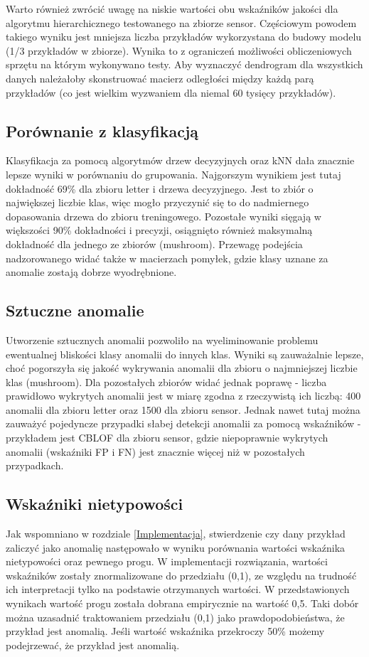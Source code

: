\documentclass[11pt,a4paper,twoside]{article}
\begin{document}
Warto również zwrócić uwagę na niskie wartości obu wskaźników jakości dla algorytmu hierarchicznego testowanego na zbiorze sensor. Częściowym powodem takiego wyniku jest mniejsza liczba przykładów wykorzystana do budowy modelu (1/3 przykładów w zbiorze). Wynika to z ograniczeń możliwości obliczeniowych sprzętu na którym wykonywano testy. Aby wyznaczyć dendrogram dla wszystkich danych należałoby skonstruować macierz odległości między każdą parą przykładów (co jest wielkim wyzwaniem dla niemal 60 tysięcy przykładów).

\subsection{Porównanie z klasyfikacją}

Klasyfikacja za pomocą algorytmów drzew decyzyjnych oraz kNN dała znacznie lepsze wyniki w porównaniu do grupowania. Najgorszym wynikiem jest tutaj dokładność 69\% dla zbioru letter i drzewa decyzyjnego. Jest to zbiór o największej liczbie klas, więc mogło przyczynić się to do nadmiernego dopasowania drzewa do zbioru treningowego. Pozostałe wyniki sięgają w większości 90\% dokładności i precyzji, osiągnięto również maksymalną dokładność dla jednego ze zbiorów (mushroom). Przewagę podejścia nadzorowanego widać także w macierzach pomyłek, gdzie klasy uznane za anomalie zostają dobrze wyodrębnione.

\subsection{Sztuczne anomalie}

Utworzenie sztucznych anomalii pozwoliło na wyeliminowanie problemu ewentualnej bliskości klasy anomalii do innych klas. Wyniki są zauważalnie lepsze, choć pogorszyła się jakość wykrywania anomalii dla zbioru o najmniejszej liczbie klas (mushroom). Dla pozostałych zbiorów widać jednak poprawę - liczba prawidłowo wykrytych anomalii jest w miarę zgodna z rzeczywistą ich liczbą: 400 anomalii dla zbioru letter oraz 1500 dla zbioru sensor. Jednak nawet tutaj można zauważyć pojedyncze przypadki słabej detekcji anomalii za pomocą wskaźników - przykładem jest CBLOF dla zbioru sensor, gdzie niepoprawnie wykrytych anomalii (wskaźniki FP i FN) jest znacznie więcej niż w pozostałych przypadkach.

\subsection{Wskaźniki nietypowości}
Jak wspomniano w rozdziale \ref{Implementacja}, stwierdzenie czy dany przykład zaliczyć jako anomalię następowało w wyniku porównania wartości wskaźnika nietypowości oraz pewnego progu. W implementacji rozwiązania, wartości wskaźników zostały znormalizowane do przedziału (0,1), ze względu na trudność ich interpretacji tylko na podstawie otrzymanych wartości. W przedstawionych wynikach wartość progu została dobrana empirycznie na wartość 0,5. Taki dobór można uzasadnić traktowaniem przedziału (0,1) jako prawdopodobieństwa, że przykład jest anomalią. Jeśli wartość wskaźnika przekroczy 50\% możemy podejrzewać, że przykład jest anomalią. 
\end{document}
